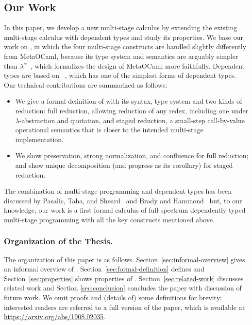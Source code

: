 
\subsection{Our Work}
In this paper, we develop a new multi-stage calculus \LMD by extending
the existing multi-stage calculus \LTP\cite{Hanada2014} with dependent
types and study its properties.  We base our work on \LTP, in which
the four multi-stage constructs are handled slightly differently from
MetaOCaml, because its type system and semantics are arguably simpler
than \(\lambda^\alpha\)~\cite{taha2003environment}, which formalizes
the design of MetaOCaml more faithfully.  Dependent types are based on
\LLF~\cite{attapl}, which has one of the simplest forms of dependent
types.  Our technical contributions are summarized as follows:
\begin{itemize}
\item We give a formal definition of \LMD with its syntax, type system and
two kinds of reduction: full reduction, allowing reduction of any redex,
including one under $\lambda$-abstraction and quotation, and staged reduction, a
small-step call-by-value operational semantics that is closer to the intended
multi-stage implementation.
\item We show preservation, strong normalization, and confluence for
  full reduction; and show unique decomposition (and progress as its
  corollary) for staged reduction.
\end{itemize}
The combination of multi-stage programming and dependent types has
been discussed by Pasalic, Taha, and Sheard~\cite{pasalic2002tagless}
and Brady and Hammond~\cite{brady2006dependently} but, to our
knowledge, our work is a first formal calculus of full-spectrum dependently typed
multi-stage programming with all the key constructs mentioned above.

\subsubsection{Organization of the Thesis.}

The organization of this paper is as follows.
Section~\ref{sec:informal-overview} gives an informal overview of
\LMD.  Section~\ref{sec:formal-definition} defines \LMD and
Section~\ref{sec:properties} shows properties of \LMD.
Section~\ref{sec:related-work} discusses related work and Section
\ref{sec:conclusion} concludes the paper with discussion of future
work.  We omit proofs and (details of) some definitions for brevity;
interested readers are referred to a full version of the paper,
which is available at \url{https://arxiv.org/abs/1908.02035}.

